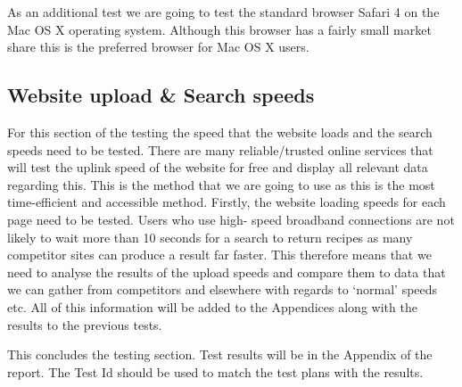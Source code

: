 \newline{}
\newline{}
As an additional test we are going to test the standard browser Safari 4 
on the Mac OS X operating system. Although this browser has a fairly small market 
share this is the preferred browser for Mac OS X users.

\subsection{Website upload \& Search speeds}
For this section of the testing the speed that the website loads and the search speeds need
 to be tested. There are many reliable/trusted online services that will test the uplink 
speed of the website for free and display all relevant data regarding this. This is the 
method that we are going to use as this is the most time-efficient and accessible method. 
Firstly, the website loading speeds for each page need to be tested. Users who use high-
speed broadband connections are not likely to wait more than 10 seconds for a search to 
return recipes as many competitor sites can produce a result far faster.  This therefore 
means that we need to analyse the results of the upload speeds and compare them to data 
that we can gather from competitors and elsewhere with regards to ‘normal’ speeds etc. 
All of this information will be added to the Appendices along with the results to the 
previous tests.

This concludes the testing section. Test results will be in the Appendix of the report. 
The Test Id should be used to match the test plans with the results. 








